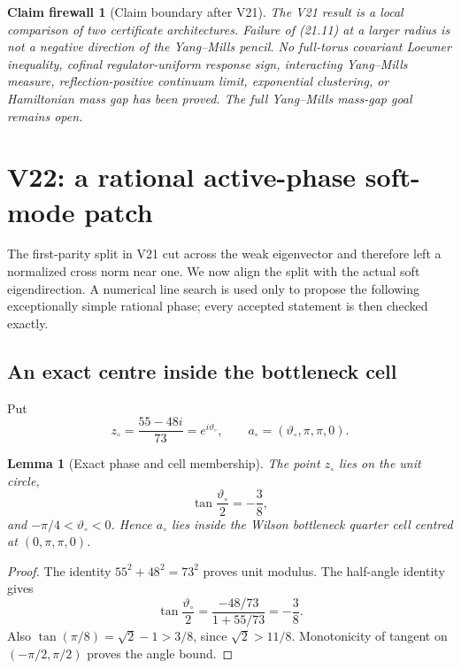 \documentclass[11pt,oneside]{article}
\newtheorem{lemma}[theorem]{Lemma}
\newtheorem{firewall}[theorem]{Claim firewall}
\theoremstyle{definition}
\theoremstyle{remark}
\begin{document}
\begin{firewall}[Claim boundary after V21]
\label{fire:newv21-final}
The V21 result is a local comparison of two certificate
architectures.  Failure of (21.11) at a larger radius is not a
negative direction of the Yang--Mills pencil.  No full-torus
covariant Loewner inequality, cofinal regulator-uniform response
sign, interacting Yang--Mills measure, reflection-positive
continuum limit, exponential clustering, or Hamiltonian mass gap
has been proved.  The full Yang--Mills mass-gap goal remains open.
\end{firewall}

\section{V22: a rational active-phase soft-mode patch}
\label{sec:newv22-soft-mode}

The first-parity split in V21 cut across the weak eigenvector and
therefore left a normalized cross norm near one.  We now align the
split with the actual soft eigendirection.  A numerical line search
is used only to propose the following exceptionally simple rational
phase; every accepted statement is then checked exactly.

\subsection{An exact centre inside the bottleneck cell}

Put
\[
 z_\circ=\frac{55-48i}{73}=e^{i\vartheta_\circ},
 \qquad
 a_\circ=(\vartheta_\circ,\pi,\pi,0).                    \tag{22.1}
\]

\begin{lemma}[Exact phase and cell membership]
\label{lem:newv22-phase}
The point \(z_\circ\) lies on the unit circle,
\[
 \tan\frac{\vartheta_\circ}{2}=-\frac38,                 \tag{22.2}
\]
and \(-\pi/4<\vartheta_\circ<0\).  Hence \(a_\circ\) lies
inside the Wilson bottleneck quarter cell centred at
\((0,\pi,\pi,0)\).
\end{lemma}

\begin{proof}
The identity \(55^2+48^2=73^2\) proves unit modulus.  The
half-angle identity gives
\[
 \tan\frac{\vartheta_\circ}{2}
 =\frac{-48/73}{1+55/73}=-\frac38.
\]
Also \(\tan(\pi/8)=\sqrt2-1>3/8\), since
\(\sqrt2>11/8\).  Monotonicity of tangent on
\((-\pi/2,\pi/2)\) proves the angle bound.
\end{proof}
\end{document}
